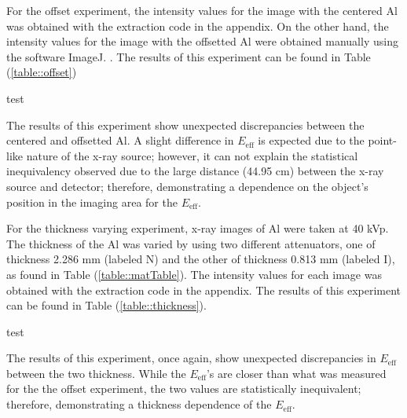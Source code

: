 For the offset experiment, the intensity values for the image with the centered Al was obtained with the extraction code in the appendix. On the other hand, the intensity values for the image with the offsetted Al were obtained manually using the software ImageJ. \cite{ImageJ}. The results of this experiment can be found in Table (\ref{table::offset})


\begin{table}[H]
    \small
    \noindent\makebox[\textwidth]{%
    
    }
    \caption{test}
    \label{table::offset}
\end{table}

The results of this experiment show unexpected discrepancies between the centered and offsetted Al. A slight difference in $E_{\text{eff}}$ is expected due to the point-like nature of the x-ray source; however, it can not explain the statistical inequivalency observed due to the large distance (44.95 cm)\cite{CArm} between the x-ray source and detector; therefore, demonstrating a dependence on the object's position in the imaging area for the $E_{\text{eff}}$.


For the thickness varying experiment, x-ray images of Al were taken at 40 kVp. The thickness of the Al was varied by using two different attenuators, one of thickness 2.286 mm (labeled N) and the other of thickness 0.813 mm (labeled I), as found in Table (\ref{table::matTable}). The intensity values for each image was obtained with the extraction code in the appendix. The results of this experiment can be found in Table (\ref{table::thickness}).

\begin{table}[H]
    \small
    \noindent\makebox[\textwidth]{%
    
    }
    \caption{test}
   	\label{table::thickness}
\end{table}

The results of this experiment, once again, show unexpected discrepancies in $E_{\text{eff}}$ between the two thickness. While the $E_{\text{eff}}$'s are closer than what was measured for the the offset experiment, the two values are statistically inequivalent; therefore, demonstrating a thickness dependence of the $E_{\text{eff}}$.















